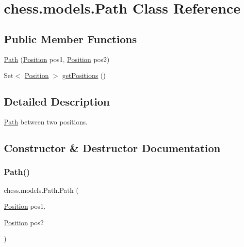 \hypertarget{classchess_1_1models_1_1_path}{}\section{chess.\+models.\+Path Class Reference}
\label{classchess_1_1models_1_1_path}
\subsection*{Public Member Functions}
\begin{DoxyCompactItemize}
\item 
\mbox{\hyperlink{classchess_1_1models_1_1_path_a5ddc0a03cb1c2b1dd93f77dbecfcdc27}{Path}} (\mbox{\hyperlink{classchess_1_1models_1_1_position}{Position}} pos1, \mbox{\hyperlink{classchess_1_1models_1_1_position}{Position}} pos2)
\item 
Set$<$ \mbox{\hyperlink{classchess_1_1models_1_1_position}{Position}} $>$ \mbox{\hyperlink{classchess_1_1models_1_1_path_adce43d0b62fd3ba9d7ac261fcf4cf7b1}{get\+Positions}} ()
\end{DoxyCompactItemize}


\subsection{Detailed Description}
\mbox{\hyperlink{classchess_1_1models_1_1_path}{Path}} between two positions. 

\subsection{Constructor \& Destructor Documentation}
\mbox{\label{classchess_1_1models_1_1_path_a5ddc0a03cb1c2b1dd93f77dbecfcdc27}} 
\subsubsection{\texorpdfstring{Path()}{Path()}}
{\footnotesize\ttfamily chess.\+models.\+Path.\+Path (\begin{DoxyParamCaption}\item[{\mbox{\hyperlink{classchess_1_1models_1_1_position}{Position}}}]{pos1,  }\item[{\mbox{\hyperlink{classchess_1_1models_1_1_position}{Position}}}]{pos2 }\end{DoxyParamCaption})}

